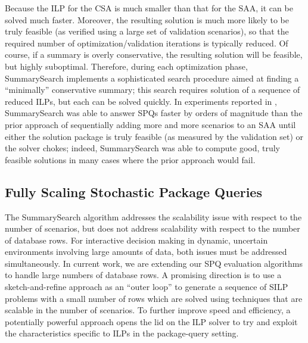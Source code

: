 \documentclass[11pt]{article}
\newcommand{\subsearch}{{\sc SummarySearch}\xspace}
\begin{document}
Because the ILP for the CSA is much smaller than that for the SAA, it can be solved much faster. Moreover, the resulting solution is much more likely to be truly feasible (as verified using a large set of validation scenarios), so that the required number of optimization/validation iterations is typically reduced. Of course, if a summary is overly conservative, the resulting solution will be feasible, but highly suboptimal. Therefore, during each optimization phase, \subsearch implements a sophisticated search procedure aimed at finding a ``minimally'' conservative summary; this search requires solution of a sequence of reduced ILPs, but each can be solved quickly. In experiments reported in \cite{BrucatoAHM2020}, \subsearch was able to answer SPQs faster by orders of magnitude than the prior approach of sequentially adding more and more scenarios to an SAA until either the solution package is truly feasible (as measured by the validation set) or the solver chokes; indeed, \subsearch was able to compute good, truly feasible solutions in many cases where the prior approach would fail. 

\subsection{Fully Scaling Stochastic Package Queries}
   \label{sec:spqSR}

The \subsearch algorithm addresses the scalability issue with respect to the number of scenarios, but does not address scalability with respect to the number of database rows. For interactive decision making in dynamic, uncertain environments involving large amounts of data, both issues must be addressed simultaneously. In current work, we are extending our SPQ evaluation algorithms to handle large numbers of database rows. A promising direction is to use a sketch-and-refine approach as an ``outer loop'' to generate a sequence of SILP problems with a small number of rows which are solved using techniques that are scalable in the number of scenarios. To further improve speed and efficiency, a potentially powerful approach opens the lid on the ILP solver to try and exploit the characteristics specific to ILPs in the package-query setting.
\end{document}
